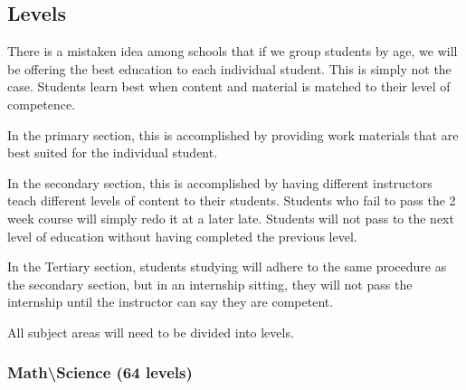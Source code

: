 \documentclass[CSHFoundation.tex]{subfiles}
\begin{document}
\subsection{Levels}

There is a mistaken idea among schools that if we group students by age, we will be offering the best education to each individual student. This is simply not the case. Students learn best when content and material is matched to their level of competence. 

In the primary section, this is accomplished by providing work materials that are best suited for the individual student.

In the secondary section, this is accomplished by having different instructors teach different levels of content to their students. Students who fail to pass the 2 week course will simply redo it at a later late. Students will not pass to the next level of education without having completed the previous level.

In the Tertiary section, students studying will adhere to the same procedure as the secondary section, but in an internship sitting, they will not pass the internship until the instructor can say they are competent. 

All subject areas will need to be divided into levels.

\subsubsection{Math\textbackslash Science (64 levels)}
\end{document}
